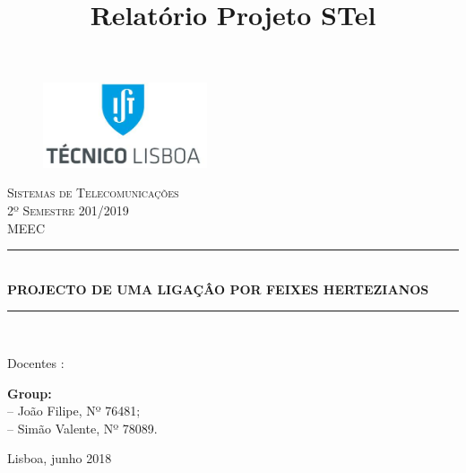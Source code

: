 \documentclass[]{article} %
\numberwithin{equation}{section} %
\numberwithin{figure}{section} %
\numberwithin{table}{section} %
\newcommand{\horrule}[1]{\rule{\linewidth}{#1}} %
\begin{document}
\begin{titlepage}
\begin{center}
\begin{figure}
\begin{flushleft}
\includegraphics[height=2.5cm]{./IST_logo.png}\\[2cm]
\end{flushleft}
\end{figure}
\title{Relatório Projeto STel}
\huge \textsc{Sistemas de Telecomunicações}\\[0.2cm]
\Large \textsc{2º Semestre 201/2019}\\[0.2cm]
\normalsize \textsc{MEEC\\[1cm]}
\horrule{1pt}\\[0cm]
\huge \textbf{PROJECTO DE UMA LIGAÇÂO POR FEIXES HERTEZIANOS}  %
\horrule{1pt}\\[1cm]
\end{center}
\begin{center}
\large
Docentes : \\[1cm]
\end{center}
\begin{flushleft}
\Large \textbf{Group:}\\[4pt]
\large
-- João Filipe, Nº 76481; \\
-- Simão Valente, Nº 78089.\\[1.5cm]
\end{flushleft}
\centering
\Large
Lisboa, junho 2018
\thispagestyle{empty}
\end{titlepage}
\tableofcontents

\pagebreak

\pagebreak
%
%
%
%
\end{document}
